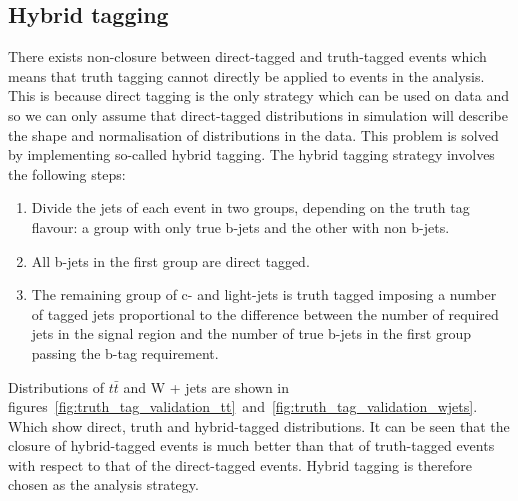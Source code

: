 \subsection{Hybrid tagging}
There exists non-closure between direct-tagged and truth-tagged events which
means that truth tagging cannot directly be applied to events in the analysis.
This is because direct tagging is the only strategy which can be used on data
and so we can only assume that direct-tagged distributions in simulation will
describe the shape and normalisation of distributions in the data. This problem
is solved by implementing so-called hybrid tagging. The hybrid tagging strategy
involves the following steps:
\begin{enumerate}
\item Divide the jets of each event in two groups, depending on the truth tag
  flavour: a group with only true b-jets and the other with non b-jets.
  
\item All b-jets in the first group are direct tagged.
  
\item  The remaining group of c- and light-jets is truth tagged imposing a
  number of tagged jets proportional to the difference between the number of
  required jets in the signal region and the number of true b-jets in the first
  group passing the b-tag requirement.
\end{enumerate}
Distributions of $t\bar{t}$ and W + jets are shown in
figures~\ref{fig:truth_tag_validation_tt}~and~\ref{fig:truth_tag_validation_wjets}.
Which show direct, truth and hybrid-tagged distributions. It can be seen that
the closure of hybrid-tagged events is much better than that of truth-tagged
events with respect to that of the direct-tagged events. Hybrid tagging is
therefore chosen as the analysis strategy.



